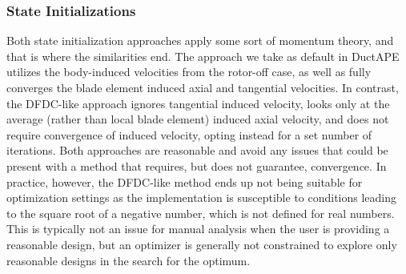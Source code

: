 %         



\subsubsection{State Initializations}

Both state initialization approaches apply some sort of momentum theory, and that is where the similarities end.
%
The approach we take as default in DuctAPE utilizes the body-induced velocities from the rotor-off case, as well as fully converges the blade element induced axial and tangential velocities.
%
In contrast, the DFDC-like approach ignores tangential induced velocity, looks only at the average (rather than local blade element) induced axial velocity, and does not require convergence of induced velocity, opting instead for a set number of iterations.
%
Both approaches are reasonable and avoid any issues that could be present with a method that requires, but does not guarantee, convergence.
%
In practice, however, the DFDC-like method ends up not being suitable for optimization settings as the implementation is susceptible to conditions leading to the square root of a negative number, which is not defined for real numbers.
%
This is typically not an issue for manual analysis when the user is providing a reasonable design, but an optimizer is generally not constrained to explore only reasonable designs in the search for the optimum.


